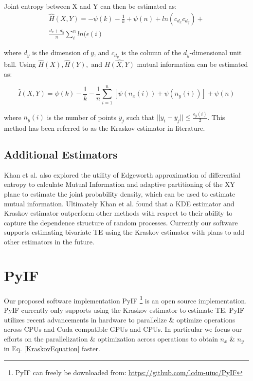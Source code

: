 \documentclass[conference]{IEEEtran}
\begin{document}
Joint entropy between X and Y can then be estimated as:
\setlength{\arraycolsep}{0.0em}
\begin{eqnarray}
\hat{H}(X,Y) = - \psi(k) - \frac{1}{k} + \psi(n) + ln(c_{d_x} c_{d_y})  +  \nonumber\\
\frac{d_x + d_y}{n} \sum^n_i ln(\epsilon(i)
\end{eqnarray}
\setlength{\arraycolsep}{1pt}


\noindent where \(d_y\) is the dimension of \(y\), and \(c_{d_y}\) is the column of the \(d_y\)-dimensional unit ball. Using \(\hat{H}(X), \hat{H}(Y),\) and \(\hat{H(X,Y)}\) mutual information can be estimated as:

\begin{equation}
\label{KraskovEquation}
\hat{I}(X,Y) = \psi(k) - \frac{1}{k} - \frac{1}{n}  \sum_{i=1}^n [\psi(n_x(i)) + \psi(n_y(i))] + \psi(n)
\end{equation}

\noindent where \(n_y(i)\) is the number of points \(y_j\) such that \(|| y_i - y_j || \leq \frac{\epsilon_y(i)}{2} \). This method has been referred to as the Kraskov estimator in literature.

\subsection{Additional Estimators}
Khan et al. also explored the utility of Edgeworth approximation of differential entropy to calculate Mutual Information and adaptive partitioning of the XY plane to estimate the joint probability density, which can be used to estimate mutual information. Ultimately Khan et al. found that a KDE estimator and Kraskov estimator outperform  other methods  with respect to their ability to capture the dependence structure of random processes. Currently our software supports estimating bivariate TE using the Kraskov estimator with plans to add other estimators in the future.

\section{PyIF}

Our proposed software implementation PyIF \footnote{PyIF can freely be downloaded from: \url{https://github.com/lcdm-uiuc/PyIF}} is an open source implementation. PyIF currently only supports using the Kraskov estimator to estimate TE. PyIF utilizes recent advancements in hardware to parallelize \& optimize operations across CPUs and Cuda compatible GPUs \cite{CUDA} and CPUs. In particular we focus our efforts on the parallelization \& optimization across operations to obtain \(n_x\)  \& \(n_y\) in Eq. \ref{KraskovEquation} faster.
\end{document}
